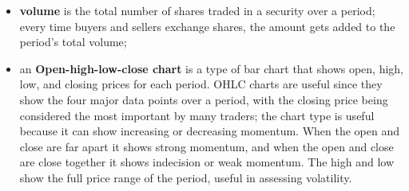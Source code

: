 \begin{itemize}
    \item \textbf{volume} is the total number of shares traded in a security 
over a period; every time buyers and sellers exchange shares, the amount gets 
added to the period’s total volume;
    \item an \textbf{Open-high-low-close chart} is a type of bar chart that
shows open, high, low, and closing prices for each period. OHLC charts are
useful since they show the four major data points over a period, with the
closing price being considered the most important by many traders; the chart
type is useful because it can show increasing or decreasing momentum. When the
open and close are far apart it shows strong momentum, and when the open and
close are close together it shows indecision or weak momentum. The high and low
show the full price range of the period, useful in assessing volatility.
\end{itemize}
